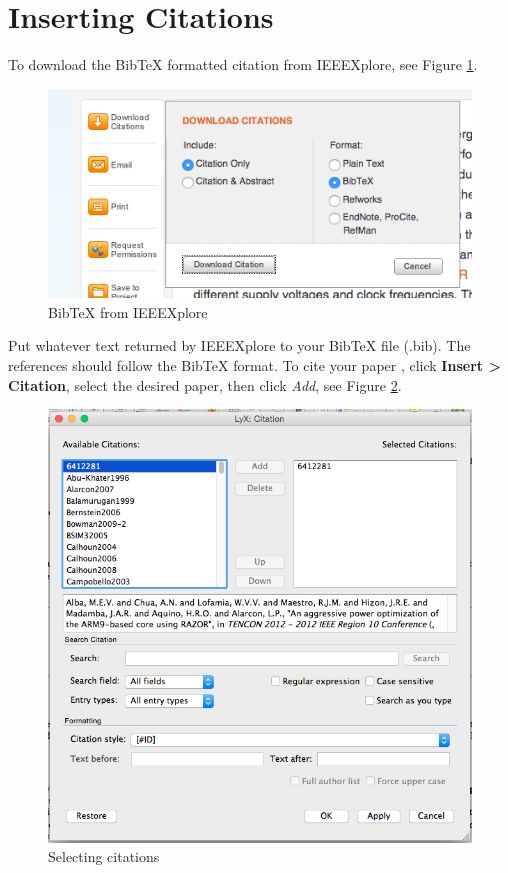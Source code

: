 \documentclass[english]{upeeei}
\begin{document}
\section{Inserting Citations}

To download the Bib\TeX{} formatted citation from IEEEXplore, see Figure
\ref{fig:BibTeX-from-IEEEXplore}.

\begin{figure}[H]
\begin{centering}
\includegraphics[width=0.55\columnwidth]{images/bibtex}
\par\end{centering}
\caption{Bib\protect\TeX{} from IEEEXplore\label{fig:BibTeX-from-IEEEXplore}}
\end{figure}

Put whatever text returned by IEEEXplore to your Bib\TeX{} file (.bib).
The references should follow the Bib\TeX{} format. To cite your paper
, click \textbf{Insert \textgreater{} Citation}, select
the desired paper, then click \textit{Add}, see Figure \ref{fig:Selecting-citations}. 

\begin{figure}[H]
\begin{centering}
\includegraphics[width=0.7\columnwidth]{images/papers}
\par\end{centering}
\caption{Selecting citations \label{fig:Selecting-citations}}

\end{figure}
\end{document}
